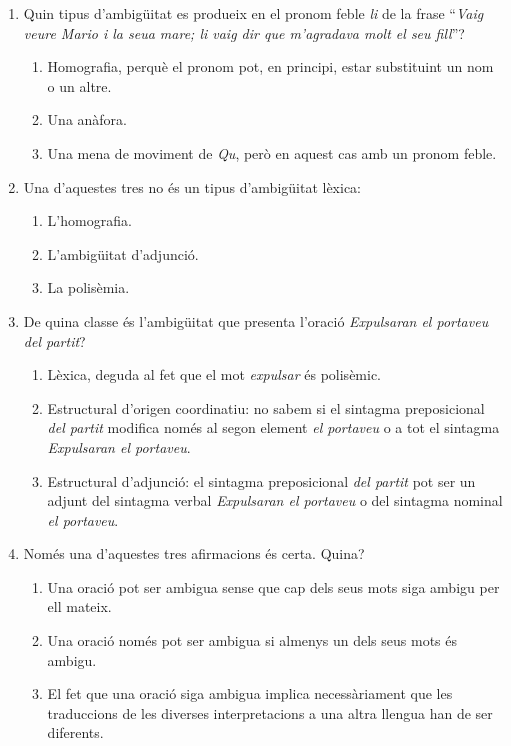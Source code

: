 \begin{enumerate}
\item Quin tipus d'ambigüitat 
es produeix en el pronom feble \emph{li} de
la frase ``\emph{Vaig veure Mario i la seua mare; li vaig dir que
m'agradava molt el seu fill}''?

\begin{enumerate}
\item Homografia, perquè el pronom pot, en principi, estar substituint un
nom o un altre.
\item Una anàfora.
\item Una mena de moviment de \emph{Qu}, però en aquest cas amb un
pronom feble.
\end{enumerate}

\item Una d'aquestes tres no és un tipus d'ambigüitat lèxica:
  \begin{enumerate}
  \item L'homografia.
  \item L'ambigüitat d'adjunció.
  \item La polisèmia.
  \end{enumerate}

\item De quina classe és l'ambigüitat que presenta l'oració
  \emph{Expulsaran el portaveu del partit}?  
  \begin{enumerate}
  \item Lèxica, deguda al
    fet que el mot \emph{expulsar} és polisèmic.  
  \item Estructural  d'origen coordinatiu: no sabem si el sintagma preposicional
    \emph{del partit} modifica només al segon element \emph{el
      portaveu} o a tot el sintagma \emph{Expulsaran el portaveu}.
  \item Estructural d'adjunció: el sintagma preposicional
    \emph{del partit} pot ser un adjunt del sintagma verbal
    \emph{Expulsaran el portaveu} o del sintagma nominal \emph{el
      portaveu}. 
  \end{enumerate}

\item Només una d'aquestes tres afirmacions és certa. Quina?
  \begin{enumerate}
  \item Una oració pot ser ambigua sense que cap dels seus mots siga ambigu per       ell mateix.
  \item Una oració només pot ser ambigua si almenys un dels seus mots
    és ambigu.
  \item El fet que una oració siga ambigua implica necessàriament que
    les traduccions de les diverses interpretacions a una altra
    llengua han de ser diferents.
  \end{enumerate}


\end{enumerate}
